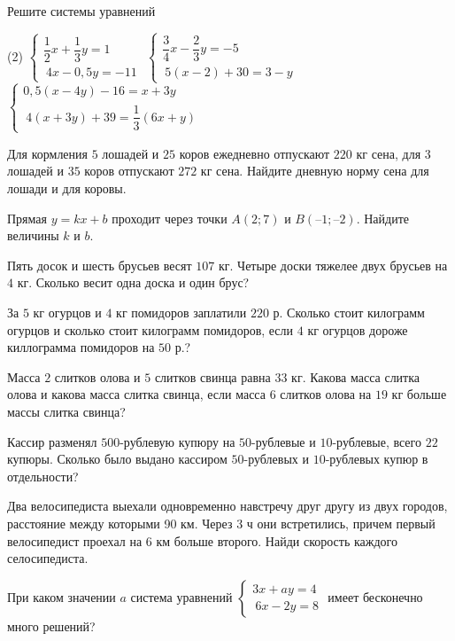 \begin{class}[number=3]
	\begin{listofex}
		\item Решите системы уравнений
		\begin{tasks}(2)
			\task \( \begin{cases}
				\dfrac{1}{2}x+\dfrac{1}{3}y=1 \\\
				4x-0,5 y=-11
			\end{cases} \)
			\task \( \begin{cases}
				\dfrac{3}{4}x-\dfrac{2}{3}y=-5\\\
				5(x-2)+30=3-y
			\end{cases} \)
			\task \( \begin{cases}
				0,5(x-4y)-16=x+3y \\\
				4(x+3y)+39=\dfrac{1}{3}(6x+y)
			\end{cases} \)
		\end{tasks}
		\item Для кормления \( 5 \) лошадей и \( 25 \) коров ежедневно отпускают \(  220 \) кг сена, для \( 3 \) лошадей и \( 35 \) коров отпускают \( 272 \) кг сена. Найдите дневную норму сена для лошади и для коровы.
		\item Прямая \( y = kx + b \) проходит через точки \( A (2; 7) \) и \( B (–1; –2) \). Найдите величины \( k \) и \( b \).
		\item Пять досок и шесть брусьев весят \( 107 \) кг. Четыре доски тяжелее двух брусьев на \( 4 \) кг. Сколько весит одна доска и один брус?
		\item За \( 5 \) кг огурцов и \( 4 \) кг помидоров заплатили \( 220 \) р. Сколько стоит килограмм огурцов и сколько стоит килограмм помидоров, если \( 4 \) кг огурцов дороже киллограмма помидоров на \( 50 \) р.?
		\item Масса \( 2 \) слитков олова и \( 5 \) слитков свинца равна \( 33 \) кг. Какова масса слитка олова и какова масса слитка свинца, если масса \( 6 \) слитков олова на \( 19 \) кг больше массы слитка свинца?
		\item Кассир разменял \( 500 \)-рублевую купюру на \( 50 \)-рублевые и \( 10 \)-рублевые, всего \( 22 \) купюры. Сколько было выдано кассиром \( 50 \)-рублевых и \( 10 \)-рублевых купюр в отдельности?
		\item  Два велосипедиста выехали одновременно навстречу друг другу из двух городов, расстояние между которыми 90 км. Через 3 ч они встретились, причем первый велосипедист проехал на 6 км больше второго. Найди скорость каждого селосипедиста.
		\item  При каком значении \( a \) система уравнений \( \begin{cases}
			3x+ay=4 \\\
			6x-2y=8
		\end{cases} \) имеет бесконечно много решений?
	\end{listofex}
\end{class}

